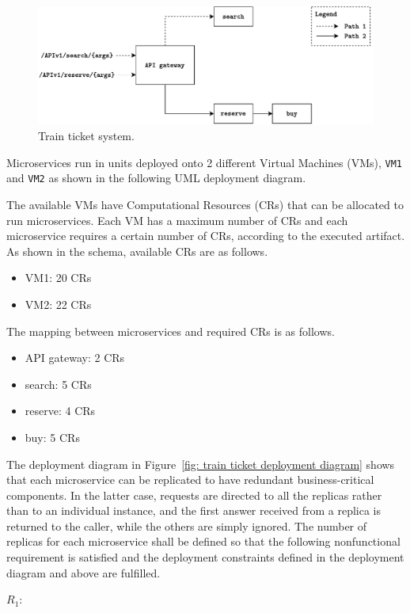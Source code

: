 \begin{figure}[!htp]
    \centering
    \includegraphics[width=\textwidth]{img/train-ticket-system-1.pdf}
    \caption{Train ticket system.}
    \label{fig: train ticket system}
\end{figure}

\noindent
Microservices run in units deployed onto 2 different Virtual Machines (VMs), \texttt{VM1} and \texttt{VM2} as shown in the following UML deployment diagram.

The available VMs have Computational Resources (CRs) that can be allocated to run microservices. Each VM has a maximum number of CRs and each microservice requires a certain number of CRs, according to the executed artifact. As shown in the schema, available CRs are as follows.
\begin{itemize}
    \item VM1: 20 CRs
    \item VM2: 22 CRs
\end{itemize}
The mapping between microservices and required CRs is as follows.
\begin{itemize}
    \item API gateway: 2 CRs
    \item search: 5 CRs
    \item reserve: 4 CRs
    \item buy: 5 CRs
\end{itemize}
The deployment diagram in Figure~\ref{fig: train ticket deployment diagram} shows that each microservice can be replicated to have redundant business-critical components. In the latter case, requests are directed to all the replicas rather than to an individual instance, and the first answer received from a replica is returned to the caller, while the others are simply ignored. The number of replicas for each microservice shall be defined so that the following nonfunctional requirement is satisfied and the deployment constraints defined in the deployment diagram and above are fulfilled.

\highspace
$R_{1}$: 


